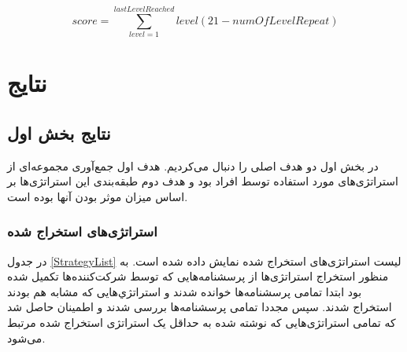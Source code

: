 \documentclass[twoside, a4paper,11pt]{book}
\numberwithin{equation}{chapter}
\numberwithin{table}{chapter}
\numberwithin{figure}{chapter}
\numberwithin{equation}{chapter}
\begin{document}
\begin{equation}
	score = \sum_{level=1}^{lastLevelReached} level(21-numOfLevelRepeat)
\end{equation}


\chapter{نتایج}
\label{chapter:experiments}
\thispagestyle{plain}
\section{نتایج بخش اول}
در بخش اول دو هدف اصلی را دنبال می‌کردیم. هدف اول جمع‌آوری مجموعه‌ای از استراتژی‌های مورد استفاده توسط افراد بود و هدف دوم طبقه‌بندی این استراتژی‌ها بر اساس میزان موثر بودن آنها بوده است. 
\subsection{استراتژی‌های استخراج شده}
در جدول \ref{StrategyList} لیست استراتژی‌های استخراج شده نمایش داده شده است. به منظور استخراج استراتژی‌ها از پرسشنامه‌هایی که توسط شرکت‌کننده‌ها تکمیل شده بود ابتدا تمامی پرسشنامه‌ها خوانده شدند و استراتژي‌هایی که مشابه هم بودند استخراج شدند. سپس مجددا تمامی پرسشنامه‌ها بررسی شدند و اطمینان حاصل شد که تمامی استراتژی‌هایی که نوشته شده به حداقل یک استراتژی استخراج شده مرتبط می‌شود. 
\end{document}
